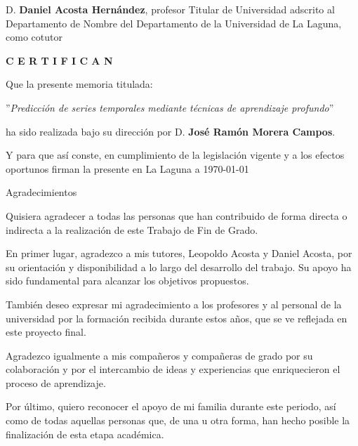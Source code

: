 \documentclass[spanish,a4paper,12pt,oneside]{extreport}
\begin{document}
\bigskip
D. {\bf Daniel Acosta Hernández}, profesor Titular de Universidad adscrito al Departamento de Nombre del Departamento de la Universidad de La Laguna, como cotutor\pagestyle{empty}

\bigskip
\bigskip
{\bf C E R T I F I C A N}

\bigskip
\bigskip
Que la presente memoria titulada:

\bigskip
''{\it Predicción de series temporales mediante técnicas de aprendizaje profundo}''

\bigskip
\bigskip
\bigskip

\noindent ha sido realizada bajo su dirección por D. {\bf José Ramón Morera Campos}.

\bigskip
\bigskip

Y para que así conste, en cumplimiento de la legislación vigente y a los efectos
oportunos firman la presente en La Laguna a \today

\newpage
\thispagestyle{empty}

{ \flushright

\begin{LARGE}
Agradecimientos
\end{LARGE}

\hspace{3mm}

\begin{large}
Quisiera agradecer a todas las personas que han contribuido de forma directa o indirecta a la realización de este Trabajo de Fin de Grado.

En primer lugar, agradezco a mis tutores, Leopoldo Acosta y Daniel Acosta, por su orientación y disponibilidad a lo largo del desarrollo del trabajo. Su apoyo ha sido fundamental para alcanzar los objetivos propuestos.

También deseo expresar mi agradecimiento a los profesores y al personal de la universidad por la formación recibida durante estos años, que se ve reflejada en este proyecto final.

Agradezco igualmente a mis compañeros y compañeras de grado por su colaboración y por el intercambio de ideas y experiencias que enriquecieron el proceso de aprendizaje.

Por último, quiero reconocer el apoyo de mi familia durante este periodo, así como de todas aquellas personas que, de una u otra forma, han hecho posible la finalización de esta etapa académica.
\end{large}

}
\newpage
\thispagestyle{empty}
\end{document}
